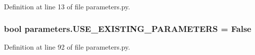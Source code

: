 Definition at line 13 of file parameters.\+py.

\subsubsection[{\texorpdfstring{U\+S\+E\+\_\+\+E\+X\+I\+S\+T\+I\+N\+G\+\_\+\+P\+A\+R\+A\+M\+E\+T\+E\+RS}{USE_EXISTING_PARAMETERS}}]{\setlength{\rightskip}{0pt plus 5cm}bool parameters.\+U\+S\+E\+\_\+\+E\+X\+I\+S\+T\+I\+N\+G\+\_\+\+P\+A\+R\+A\+M\+E\+T\+E\+RS = False}\hypertarget{namespaceparameters_a0cffcb215ac12a1700baedb1a13ec8d5}{}\label{namespaceparameters_a0cffcb215ac12a1700baedb1a13ec8d5}


Definition at line 92 of file parameters.\+py.

